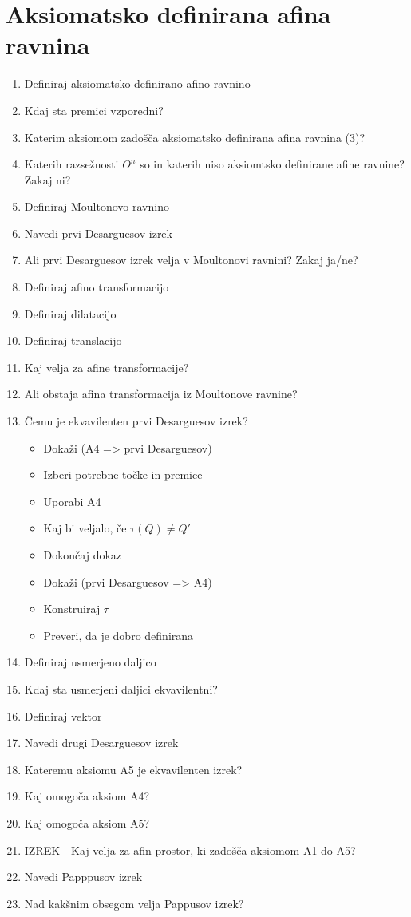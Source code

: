 \documentclass{article}
\begin{document}
    \section{Aksiomatsko definirana afina ravnina}
    \begin{enumerate}
        \item Definiraj aksiomatsko definirano afino ravnino
        \item Kdaj sta premici vzporedni?
        \item Katerim aksiomom zadošča aksiomatsko definirana afina ravnina (3)?
        \item Katerih razsežnosti $O^n$ so in katerih niso aksiomtsko definirane afine ravnine? Zakaj ni?
        \item Definiraj Moultonovo ravnino
        \item Navedi prvi Desarguesov izrek
        \item Ali prvi Desarguesov izrek velja v Moultonovi ravnini? Zakaj ja/ne?
        \item Definiraj afino transformacijo
        \item Definiraj dilatacijo
        \item Definiraj translacijo
        \item Kaj velja za afine transformacije?
        \item Ali obstaja afina transformacija iz Moultonove ravnine?
        \item Čemu je ekvavilenten prvi Desarguesov izrek?
        \begin{itemize}
            \item Dokaži (A4 => prvi Desarguesov) 
            \item Izberi potrebne točke in premice
            \item Uporabi A4
            \item Kaj bi veljalo, če $\tau (Q) \neq Q'$
            \item Dokončaj dokaz
            \item Dokaži (prvi Desarguesov => A4)
            \item Konstruiraj $\tau$
            \item Preveri, da je dobro definirana
        \end{itemize}
        \item Definiraj usmerjeno daljico
        \item Kdaj sta usmerjeni daljici ekvavilentni?
        \item Definiraj vektor
        \item Navedi drugi Desarguesov izrek
        \item Kateremu aksiomu A5 je ekvavilenten izrek?
        \item Kaj omogoča aksiom A4?
        \item Kaj omogoča aksiom A5?
        \item IZREK - Kaj velja za afin prostor, ki zadošča aksiomom A1 do A5?
        \item Navedi Papppusov izrek
        \item Nad kakšnim obsegom velja Pappusov izrek?
    \end{enumerate}
\end{document}
